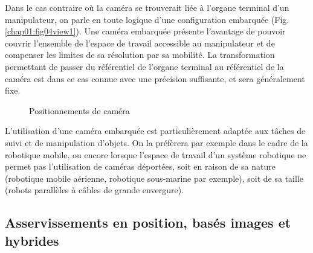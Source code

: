 Dans le cas contraire o\`u la cam\'era se trouverait li\'ee \`a l'organe 
terminal d'un manipulateur, on parle en toute logique d'une configuration 
embarquée (Fig.\ref{chap01:fig04view1}). Une cam\'era embarqu\'ee pr\'esente 
l'avantage de pouvoir couvrir l'en\-semble de l'espace de travail accessible au 
manipulateur et de compenser les limites de sa r\'esolution par sa mobilit\'e.
La transformation permettant de passer du r\'ef\'erentiel de l'organe terminal 
au r\'ef\'erentiel de la cam\'era est dans ce cas connue avec une pr\'ecision 
suffisante, et sera g\'en\'eralement fixe.

\begin{figure}[htp]
  \centering
   \hfill
    \caption{\footnotesize{Positionnements de caméra}}
\label{chap01:fig04}
\end{figure}

L'utilisation d'une cam\'era embarqu\'ee est particuli\`erement adapt\'ee aux 
t\^aches de suivi et de manipulation d'objets. On la pr\'ef\`erera par exemple 
dans le cadre de la robotique mobile, ou encore lorsque l'espace de travail d'un 
syst\`eme robotique ne permet pas l'utilisation de cam\'eras d\'eport\'ees, soit 
en raison de sa nature (robotique mobile a\'erienne, robotique sous-marine par 
exemple), soit de sa taille (robots parall\`eles \`a c\^ables de grande 
envergure).


\subsection{Asservissements en position, basés images et hybrides} 
\label{chap1-1-1}

